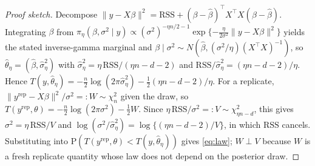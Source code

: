 \documentclass[10pt,a4paper]{amsart}
\newcommand{\Prob}{\mathrm{P}}
\newcommand{\RSS}{\mathrm{RSS}}
\newcommand{\bbeta}{\beta}
\newcommand{\bhat}{\hat{\bbeta}}
\newcommand{\chisq}{\chi^2}
\begin{document}
\begin{proof}[Proof sketch]
Decompose $\lVert y-X\bbeta\rVert^2=\RSS+(\bbeta-\bhat)^\top X^\top X(\bbeta-\bhat)$. Integrating $\bbeta$ from
$\pi_\eta(\bbeta,\sigma^2\mid y)\propto(\sigma^2)^{-\eta n/2-1}\exp\{-\tfrac{\eta}{2\sigma^2}\lVert
y-X\bbeta\rVert^2\}$ yields the stated inverse-gamma marginal and $\bbeta\mid\sigma^2\sim N(\bhat,
(\sigma^2/\eta)(X^\top X)^{-1})$, so $\hat\theta_\eta=(\bhat,\hat\sigma^2_\eta)$ with
$\hat\sigma^2_\eta=\eta\,\RSS/(\eta n-d-2)$ and $\RSS/\hat\sigma^2_\eta=(\eta n-d-2)/\eta$. Hence
$T(y,\hat\theta_\eta)=-\tfrac n2\log(2\pi\hat\sigma^2_\eta)-\tfrac12(\eta n-d-2)/\eta$. For a replicate,
$\lVert y^{\mathrm{rep}}-X\bbeta\rVert^2/\sigma^2=:W\sim\chisq_n$ given the draw, so
$T(y^{\mathrm{rep}},\theta)=-\tfrac n2\log(2\pi\sigma^2)-\tfrac12 W$. Since
$\eta\,\RSS/\sigma^2=:V\sim\chisq_{\eta n-d}$, this gives $\sigma^2=\eta\,\RSS/V$ and
$\log(\sigma^2/\hat\sigma^2_\eta)=\log\{(\eta n-d-2)/V\}$, in which $\RSS$ cancels. Substituting into
$\Prob(T(y^{\mathrm{rep}},\theta)<T(y,\hat\theta_\eta))$ gives \eqref{eq:law}; $W\perp V$ because $W$ is a fresh
replicate quantity whose law does not depend on the posterior draw.
\end{proof}
\end{document}
